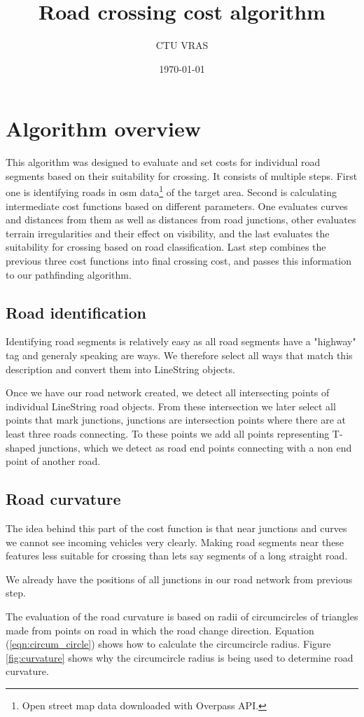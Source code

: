 \documentclass[oneside]{article}
\title{Road crossing cost algorithm}
\author{CTU VRAS}
\date{\today}
\begin{document}
    \section{Algorithm overview}
    This algorithm was designed to evaluate and set costs for individual road segments based on their suitability for crossing. It consists of multiple steps. First one is identifying roads in osm data\footnote{Open street map data downloaded with Overpass API.} of the target area. Second is calculating intermediate cost functions based on different parameters. One evaluates curves and distances from them as well as distances from road junctions, other evaluates terrain irregularities and their effect on visibility, and the last evaluates the suitability for crossing based on road classification. Last step combines the previous three cost functions into final crossing cost, and passes this information to our pathfinding algorithm.

        \subsection{Road identification}
        Identifying road segments is relatively easy as all road segments have a "highway" tag and generaly speaking are ways. We therefore select all ways that match this description and convert them into LineString objects.
        
        Once we have our road network created, we detect all intersecting points of individual LineString road objects. From these intersection we later select all points that mark junctions, junctions are intersection points where there are at least three roads connecting. To these points we add all points representing T-shaped junctions, which we detect as road end points connecting with a non end point of another road.

        \subsection{Road curvature}
        \label{sec:rd_cur}
        The idea behind this part of the cost function is that near junctions and curves we cannot see incoming vehicles very clearly. Making road segments near these features less suitable for crossing than lets say segments of a long straight road.

        We already have the positions of all junctions in our road network from previous step.

        The evaluation of the road curvature is based on radii of circumcircles of triangles made from points on road in which the road change direction. Equation (\ref{eqn:circum_circle}) shows how to calculate the circumcircle radius. Figure \ref{fig:curvature} shows why the circumcircle radius is being used to determine road curvature.
\end{document}
